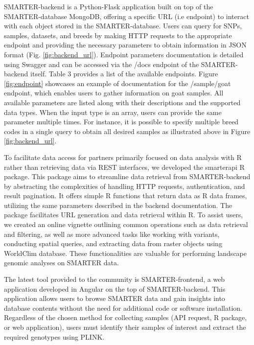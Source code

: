 \documentclass[a4paper,num-refs,gigabyte]{oup-contemporary}
\begin{document}
SMARTER-backend is a Python-Flask application built on top of the SMARTER-database MongoDB, offering a specific URL (i.e endpoint) to interact with each object stored in the SMARTER-database. Users can query for SNPs, samples, datasets, and breeds by making HTTP requests to the appropriate endpoint and providing the necessary parameters to obtain information in JSON format (Fig. \ref{fig:backend_url}).
Endpoint parameters documentation is detailed using Swagger and can be accessed via the /docs endpoint of the SMARTER-backend itself. Table 3 provides a list of the available endpoints.
Figure \ref{fig:endpoint} showcases an example of documentation for the /sample/goat endpoint, which enables users to gather information on goat samples. All available parameters are listed along with their descriptions and the supported data types. When the input type is an array, users can provide the same parameter multiple times. For instance, it is possible to specify multiple breed codes in a single query to obtain all desired samples as illustrated above in Figure \ref{fig:backend_url}.

To facilitate data access for partners primarily focused on data analysis with R rather than retrieving data via REST interfaces, we developed the smarterapi R package\citep{RSMARTERAPI}. This package aims to streamline data retrieval from SMARTER-backend by abstracting the complexities of handling HTTP requests, authentication, and result pagination. It offers simple R functions that return data as R data frames, utilizing the same parameters described in the backend documentation. The package facilitates URL generation and data retrieval within R.
To assist users, we created an online vignette outlining common operations such as data retrieval and filtering, as well as more advanced tasks like working with variants, conducting spatial queries, and extracting data from raster objects using WorldClim database\citep{Fick2017}. These functionalities are valuable for performing landscape genomic analyses on SMARTER data.

The latest tool provided to the community is SMARTER-frontend\citep{SMARTERfrontend}, a web application developed in Angular\citep{Angular} on the top of SMARTER-backend. This application allows users to browse SMARTER data and gain insights into database contents without the need for additional code or software installation. Regardless of the chosen method for collecting samples (API request, R package, or web application), users must identify their samples of interest and extract the required genotypes using PLINK.
\end{document}
